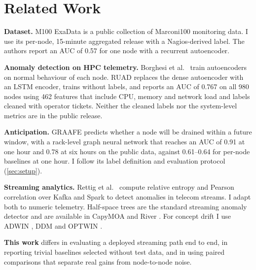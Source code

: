 \section{Related Work}
\label{sec:related}
\textbf{Dataset.} M100 ExaData \cite{borghesi2023m100} is a public collection of Marconi100 monitoring data. I use its per-node, 15-minute aggregated release with a Nagios-derived label. The authors report an AUC of 0.57 for one node with a recurrent autoencoder.

\textbf{Anomaly detection on HPC telemetry.} Borghesi et al.\ \cite{borghesi2019autoencoder} train autoencoders on normal behaviour of each node. RUAD \cite{molan2023ruad} replaces the dense autoencoder with an LSTM encoder, trains without labels, and reports an AUC of 0.767 on all 980 nodes using 462 features that include CPU, memory and network load and labels cleaned with operator tickets. Neither the cleaned labels nor the system-level metrics are in the public release.

\textbf{Anticipation.} GRAAFE \cite{molan2024graafe} predicts whether a node will be drained within a future window, with a rack-level graph neural network that reaches an AUC of 0.91 at one hour and 0.78 at six hours on the public data, against 0.61--0.64 for per-node baselines at one hour. I follow its label definition and evaluation protocol (\cref{sec:setup}).

\textbf{Streaming analytics.} Rettig et al.\ \cite{rettig2015online} compute relative entropy and Pearson correlation over Kafka and Spark to detect anomalies in telecom streams. I adapt both to numeric telemetry. Half-space trees \cite{tan2011hst} are the standard streaming anomaly detector and are available in CapyMOA \cite{gomes2025capymoa} and River \cite{montiel2021river}. For concept drift I use ADWIN \cite{bifet2007adwin}, DDM \cite{gama2004ddm} and OPTWIN \cite{tosi2024optwin}.

\textbf{This work} differs in evaluating a deployed streaming path end to end, in reporting trivial baselines selected without test data, and in using paired comparisons that separate real gains from node-to-node noise.
